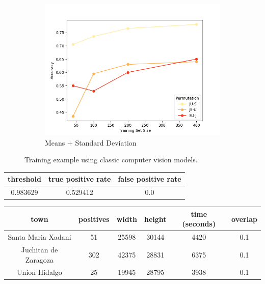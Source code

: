 \begin{figure}[ht]
\begin{subfigure}{.49\textwidth}
        \includegraphics[width=\textwidth]{images/classic-meanstd.png}
        \caption{Means + Standard Deviation}
    \end{subfigure}
  
  \caption{Training example using classic computer vision models.}
  \label{fig:whatever}
\end{figure}



\begin{center}
  \begin{tabular}{|c|c|c|}
    \hline
    threshold & true positive rate & false positive rate \\ \hline
    0.983629 & 0.529412 & 0.0 \\
    \hline
  \end{tabular}
\end{center}




\begin{center}
  \begin{tabular}{|c|c|c|c|c|c|}
    \hline
    town                 & positives & width & height & time (seconds) & overlap\\ \hline
    Santa Maria Xadani   &51         & 25598 & 30144  & 4420           & 0.1 \\ \hline
    Juchitan de Zaragoza &302        & 42375 & 28831  & 6375           & 0.1 \\ \hline
    Union Hidalgo        &25         & 19945 & 28795  & 3938           & 0.1\\
    \hline
  \end{tabular}
\end{center}




